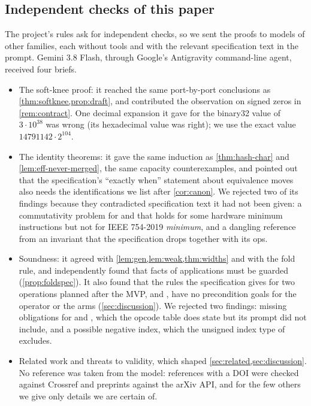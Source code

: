 \subsection{Independent checks of this paper}

The project's rules ask for independent checks, so we sent the proofs to models of other
families, each without tools and with the relevant specification text in the prompt. Gemini 3.8
Flash, through Google's Antigravity command-line agent, received four briefs.
\begin{itemize}
\item The soft-knee proof: it reached the same port-by-port conclusions as
  \cref{thm:softknee,prop:draft}, and contributed the observation on signed zeros in
  \cref{rem:contract}. One decimal expansion it gave for the binary32 value of $3\cdot10^{38}$ was
  wrong (its hexadecimal value was right); we use the exact value $14791142\cdot2^{104}$.
\item The identity theorems: it gave the same induction as \cref{thm:hash-char} and
  \cref{lem:eff-never-merged}, the same capacity counterexamples, and pointed out that the
  specification's ``exactly when'' statement about equivalence moves also needs the
  identifications we list after \cref{cor:canon}. We rejected two of its findings because
  they contradicted specification text it had not been given: a commutativity problem for
   and  that holds for some hardware minimum instructions but not for IEEE
  754-2019 \emph{minimum}, and a dangling reference from an invariant that the specification
  drops together with its ops.
\item Soundness: it agreed with \cref{lem:gen,lem:weak,thm:widths} and with the fold rule, and
  independently found that facts of  applications must be guarded
  (\cref{prop:foldspec}). It also found that the rules the specification gives for two
  operations planned after the MVP,  and , have no
  precondition goals for the operator or the arms (\cref{sec:discussion}). We rejected two
  findings: missing obligations for  and , which the opcode table does
  state but its prompt did not include, and a possible negative index, which the unsigned index
  type of  excludes.
\item Related work and threats to validity, which shaped \cref{sec:related,sec:discussion}. No
  reference was taken from the model: references with a DOI were checked against Crossref and
  preprints against the arXiv API, and for the few others we give only details we are certain
  of.
\end{itemize}
